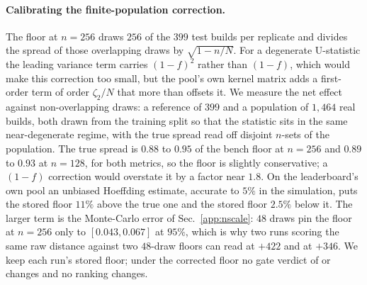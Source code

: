 \paragraph{Calibrating the finite-population correction.} The floor at $n{=}256$ draws
$256$ of the $399$ test builds per replicate and divides the spread of those overlapping
draws by $\sqrt{1-n/N}$. For a degenerate U-statistic the leading variance term carries
$(1-f)^2$ rather than $(1-f)$, which would make this correction too small, but the pool's own
kernel matrix adds a first-order term of order $\zeta_2/N$ that more than offsets it. We
measure the net effect against non-overlapping draws: a reference of $399$ and a population
of $1{,}464$ real builds, both drawn from the training split so that the statistic sits in the
same near-degenerate regime, with the true spread read off disjoint $n$-sets of the
population. The true spread is $0.88$ to $0.95$ of the bench floor at $n{=}256$ and $0.89$ to
$0.93$ at $n{=}128$, for both metrics, so the floor is slightly conservative; a $(1-f)$
correction would overstate it by a factor near $1.8$. On the leaderboard's own pool an
unbiased Hoeffding estimate, accurate to $5\%$ in the simulation, puts the stored \vkid{}
floor $11\%$ above the true one and the stored \mvkid{} floor $2.5\%$ below it. The larger
term is the Monte-Carlo error of Sec.~\ref{app:nscale}: $48$ draws pin the \vkid{} floor at
$n{=}256$ only to $[0.043, 0.067]$ at $95\%$, which is why two runs scoring the same raw
distance against two $48$-draw floors can read \matshuffle{} at $+422$ and at $+346$. We keep
each run's stored floor; under the corrected floor no gate verdict of \vkid{} or \mvkid{}
changes and no ranking changes.


